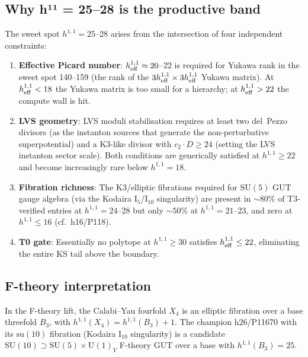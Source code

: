 \documentclass[11pt,a4paper]{article}
\newcommand{\hone}{h^{1,1}}
\begin{document}
\subsection{Why h¹¹ = 25--28 is the productive band}

The sweet spot $h^{1,1} = 25$--28 arises from the intersection of
four independent constraints:
\begin{enumerate}[noitemsep]
  \item \textbf{Effective Picard number}: $\hone_{\rm eff} \approx 20$--22
    is required for Yukawa rank in the sweet spot 140--159
    (the rank of the $3\hone_{\rm eff}\times 3\hone_{\rm eff}$ Yukawa matrix).
    At $\hone_{\rm eff} < 18$ the Yukawa matrix is too small for a hierarchy;
    at $\hone_{\rm eff} > 22$ the compute wall is hit.
  \item \textbf{LVS geometry}: LVS moduli stabilisation requires
    at least two del~Pezzo divisors (as the instanton sources
    that generate the non-perturbative superpotential) and a
    K3-like divisor with $c_2\cdot D \geq 24$ (setting the LVS
    instanton sector scale).
    Both conditions are generically satisfied at $h^{1,1} \geq 22$
    and become increasingly rare below $h^{1,1}=18$.
  \item \textbf{Fibration richness}: The K3/elliptic fibrations
    required for $\mathrm{SU}(5)$ GUT gauge algebra (via the
    Kodaira I$_5$/I$_{10}$ singularity) are present in
    $\sim 80\%$ of T3-verified entries at $h^{1,1}=24$--28
    but only $\sim 50\%$ at $h^{1,1}=21$--23,
    and zero at $h^{1,1}\leq 16$ (cf.\ h16/P118).
  \item \textbf{T0 gate}: Essentially no polytope at $h^{1,1}\geq 30$
    satisfies $\hone_{\rm eff}\leq 22$, eliminating the entire
    KS tail above the boundary.
\end{enumerate}

\subsection{F-theory interpretation}

In the F-theory lift, the Calabi--Yau fourfold $X_4$ is an
elliptic fibration over a base threefold $B_3$, with
$h^{1,1}(X_4) = h^{1,1}(B_3)+1$.
The champion h26/P11670 with its $\mathrm{su}(10)$ fibration
(Kodaira $\mathrm{I}_{10}$ singularity) is a candidate
$\mathrm{SU}(10) \supset \mathrm{SU}(5)\times\mathrm{U}(1)_Y$
F-theory GUT over a base with $h^{1,1}(B_3)=25$.
\end{document}
